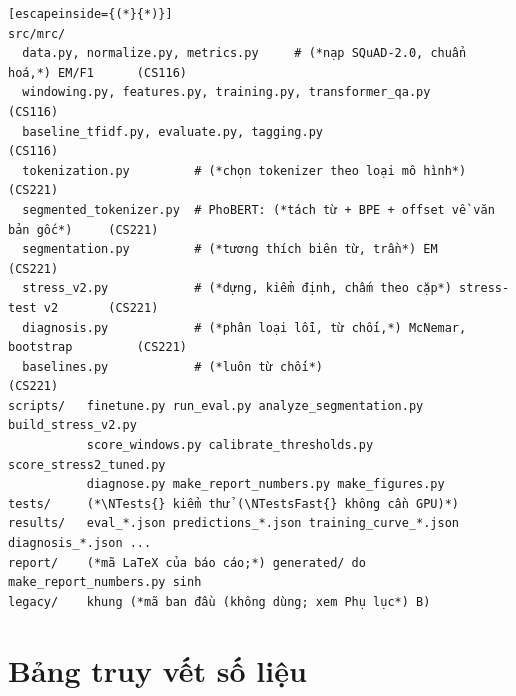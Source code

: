 \begin{lstlisting}[escapeinside={(*}{*)}]
src/mrc/
  data.py, normalize.py, metrics.py     # (*nạp SQuAD-2.0, chuẩn hoá,*) EM/F1      (CS116)
  windowing.py, features.py, training.py, transformer_qa.py                     (CS116)
  baseline_tfidf.py, evaluate.py, tagging.py                                   (CS116)
  tokenization.py         # (*chọn tokenizer theo loại mô hình*)                   (CS221)
  segmented_tokenizer.py  # PhoBERT: (*tách từ + BPE + offset về văn bản gốc*)     (CS221)
  segmentation.py         # (*tương thích biên từ, trần*) EM                       (CS221)
  stress_v2.py            # (*dựng, kiểm định, chấm theo cặp*) stress-test v2       (CS221)
  diagnosis.py            # (*phân loại lỗi, từ chối,*) McNemar, bootstrap         (CS221)
  baselines.py            # (*luôn từ chối*)                                       (CS221)
scripts/   finetune.py run_eval.py analyze_segmentation.py build_stress_v2.py
           score_windows.py calibrate_thresholds.py score_stress2_tuned.py
           diagnose.py make_report_numbers.py make_figures.py
tests/     (*\NTests{} kiểm thử (\NTestsFast{} không cần GPU)*)
results/   eval_*.json predictions_*.json training_curve_*.json diagnosis_*.json ...
report/    (*mã LaTeX của báo cáo;*) generated/ do make_report_numbers.py sinh
legacy/    khung (*mã ban đầu (không dùng; xem Phụ lục*) B)
\end{lstlisting}

\section{Bảng truy vết số liệu}
\label{app:trace}

